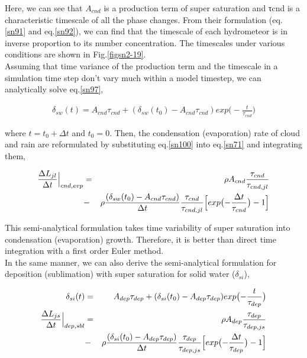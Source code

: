 Here, we can see that $A_{cnd}$ is a production term of super saturation and τcnd is a characteristic timescale of all the phase changes. From their formulation (eq.\ref{sn91} and eq.\ref{sn92}), we can find that the timescale of each hydrometeor is in inverse proportion to its number concentration. The timescales under various conditions are shown in Fig.\ref{figsn2-19}.\\
Assuming that time variance of the production term and the timescale in a simulation time step don’t vary much within a model timestep, we can analytically solve eq.\ref{sn97},

\begin{eqnarray}
\delta_{sw}(t)=A_{cnd}\tau_{cnd}+(\delta_{sw}(t_{0})-A_{cnd}\tau_{cnd})exp\bigl(-\frac{t}{\tau_{cnd}}\bigr)\label{sn100}
\end{eqnarray}

where $t = t_{0} + \Delta t$ and $t_{0} = 0$. Then, the condensation (evaporation) rate of cloud and rain are reformulated by substituting eq.\ref{sn100} into eq.\ref{sn71} and integrating them,

\begin{eqnarray}
\frac{\Delta L_{jl}}{\Delta t}\Bigr|_{cnd,evp}&=&\rho A_{cnd}\frac{\tau_{cnd}}{\tau_{cnd,jl}}\nonumber\\
&-&\rho\frac{(\delta_{sw}(t_{0})-A_{cnd}\tau_{cnd})}{\Delta t}\frac{\tau_{cnd}}{\tau_{cnd,jl}}\Bigl[exp\bigl(-\frac{\Delta t}{\tau_{cnd}}\bigr)-1\Bigr]\label{sn101}
\end{eqnarray}

This semi-analytical formulation takes time variability of super saturation into condensation (evaporation) growth. Therefore, it is better than direct time integration with a first order Euler method.\\
In the same manner, we can also derive the semi-analytical formulation for deposition (sublimation) with super saturation for solid water ($\delta_{si}$),

\begin{eqnarray}
\delta_{si}(t)&=&A_{dep}\tau_{dep}+(\delta_{si}(t_{0})-A_{dep}\tau_{dep})exp\bigl(-\frac{t}{\tau_{dep}}\bigr)\label{sn103}\\
\frac{\Delta L_{js}}{\Delta t}\Bigr|_{dep,sbl}&=&\rho A_{dep}\frac{\tau_{dep}}{\tau_{dep,js}}\nonumber\\
&-&\rho\frac{(\delta_{si}(t_{0})-A_{dep}\tau_{dep})}{\Delta t}\frac{\tau_{dep}}{\tau_{dep,js}}\Bigl[exp\bigl(-\frac{\Delta t}{\tau_{dep}}\bigr)-1\Bigr]\label{sn104}
\end{eqnarray}

